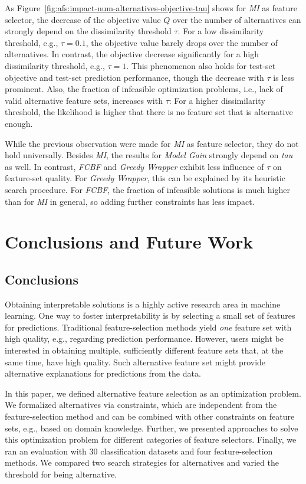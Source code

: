 \documentclass{article}
\theoremstyle{definition}
\begin{document}
As Figure~\ref{fig:afs:impact-num-alternatives-objective-tau} shows for \emph{MI} as feature selector, the decrease of the objective value $Q$ over the number of alternatives can strongly depend on the dissimilarity threshold $\tau$.
For a low dissimilarity threshold, e.g., $\tau=0.1$, the objective value barely drops over the number of alternatives.
In contrast, the objective decrease significantly for a high dissimilarity threshold, e.g., $\tau=1$.
This phenomenon also holds for test-set objective and test-set prediction performance, though the decrease with $\tau$ is less prominent.
Also, the fraction of infeasible optimization problems, i.e., lack of valid alternative feature sets, increases with $\tau$:
For a higher dissimilarity threshold, the likelihood is higher that there is no feature set that is alternative enough.

While the previous observation were made for \emph{MI} as feature selector, they do not hold universally.
Besides \emph{MI}, the results for \emph{Model Gain} strongly depend on \emph{tau} as well.
In contrast, \emph{FCBF} and \emph{Greedy Wrapper} exhibit less influence of $\tau$ on feature-set quality.
For \emph{Greedy Wrapper}, this can be explained by its heuristic search procedure.
For \emph{FCBF}, the fraction of infeasible solutions is much higher than for \emph{MI} in general, so adding further constraints has less impact.

\section{Conclusions and Future Work}
\label{sec:afs:conclusion}

\subsection{Conclusions}

Obtaining interpretable solutions is a highly active research area in machine learning.
One way to foster interpretability is by selecting a small set of features for predictions.
Traditional feature-selection methods yield \emph{one} feature set with high quality, e.g., regarding prediction performance.
However, users might be interested in obtaining multiple, sufficiently different feature sets that, at the same time, have high quality.
Such alternative feature set might provide alternative explanations for predictions from the data.

In this paper, we defined alternative feature selection as an optimization problem.
We formalized alternatives via constraints, which are independent from the feature-selection method and can be combined with other constraints on feature sets, e.g., based on domain knowledge.
Further, we presented approaches to solve this optimization problem for different categories of feature selectors.
Finally, we ran an evaluation with 30 classification datasets and four feature-selection methods.
We compared two search strategies for alternatives and varied the threshold for being alternative.
\end{document}
